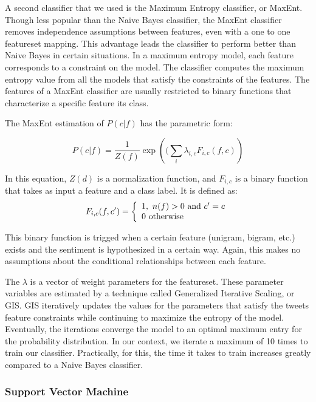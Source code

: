 \documentclass[preprint,pre,floats,aps,amsmath,amssymb,12pt]{revtex4}
\begin{document}
A second classifier that we used is the Maximum Entropy classifier, or MaxEnt. Though less popular than the Naive Bayes classifier, the MaxEnt classifier removes independence assumptions between features, even with a one to one featureset mapping. This advantage leads the classifier to perform better than Naive Bayes in certain situations. 
In a maximum entropy model, each feature corresponds to a constraint on the model. The classifier computes the maximum entropy value from all the models that satisfy the constraints of the features. The features of a MaxEnt classifier are usually restricted to binary functions that characterize a specific feature its class.

The MaxEnt estimation of $P(c | f)$ has the parametric form:
			
\[ P(c | f) = \frac{1}{Z(f)}\exp \left((\displaystyle\sum\limits_{i} \lambda_{i,c} F_{i,c}(f,c)\right)\]

In this equation, $Z(d)$ is a normalization function, and $F_{i,c}$ is a binary function that takes as input a feature and a class label. It is defined as:
\[ F_{i,c}(f,c') =  \left\lbrace
\begin{array}{lr}
1,\ n(f) > 0 $ and $  c' = c \\
0 \ $otherwise$	 
\end{array}
\right.\]

This binary function is trigged when a certain feature (unigram, bigram, etc.) exists and the sentiment is hypothesized in a certain way. Again, this makes no assumptions about the conditional relationships between each feature. 

The $\lambda$ is a vector of weight parameters for the featureset. These parameter variables are estimated by a technique called Generalized Iterative Scaling, or GIS. GIS iteratively updates the values for the parameters that satisfy the tweets feature constraints while continuing to maximize the entropy of the model. Eventually, the iterations converge the model to an optimal maximum entry for the probability distribution. In our context, we iterate a maximum of 10 times to train our classifier. Practically, for this, the time it takes to train increases greatly compared to a Naive Bayes classifier.

\subsubsection{Support Vector Machine}
\end{document}

